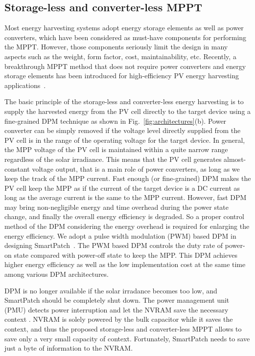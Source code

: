 \documentclass[journal]{IEEEtran}
\begin{document}
\subsection{Storage-less and converter-less MPPT}
Most energy harvesting systems adopt energy storage elements as well as power converters, which have been considered as must-have components for performing the MPPT. 
However, those components seriously limit the design in many aspects such as the weight, form factor, cost, maintainability, etc. 
Recently, a breakthrough MPPT method that does not require power converters and energy storage elements has been introduced for high-efficiency PV energy harvesting applications~\cite{Wang:ASPDAC14}. 

The basic principle of the storage-less and converter-less energy harvesting is to supply the harvested energy from the PV cell directly to the target device using a fine-grained DPM technique as shown in Fig.~\ref{fig:architectures}(b). 
Power converter can be simply removed if the voltage level directly supplied from the PV cell is in the range of the operating voltage for the target device. 
In general, the MPP voltage of the PV cell is maintained within a quite narrow range regardless of the solar irradiance. 
This means that the PV cell generates almost-constant voltage output, that is a main role of power converters, as long as we keep the track of the MPP current. 
Fast enough (or fine-grained) DPM makes the PV cell keep the MPP as if the current of the target device is a DC current as long as the average current is the same to the MPP current.
However, fast DPM may bring non-negligible energy and time overhead during the power state change, and finally the overall energy efficiency is degraded. 
So a proper control method of the DPM considering the energy overhead is required for enlarging the energy efficiency. 
We adopt a pulse width modulation (PWM) based DPM in designing SmartPatch~\cite{Lee:ASPDAC15}. 
The PWM based DPM controls the duty rate of power-on state compared with power-off state to keep the MPP.
This DPM achieves higher energy efficiency as well as the low implementation cost at the same time among various DPM architectures.

DPM is no longer available if the solar irradance becomes too low, and SmartPatch should be completely shut down. The power management unit (PMU) detects power interruption and let the NVRAM save the necessary context \cite{Balsamo:TCAD16}. 
NVRAM is solely powered by the bulk capacitor while it saves the context, and thus the proposed storage-less and converter-less MPPT allows to save only a very small capacity of context. Fortunately, SmartPatch needs to save just a byte of information to the NVRAM. 
\end{document}
